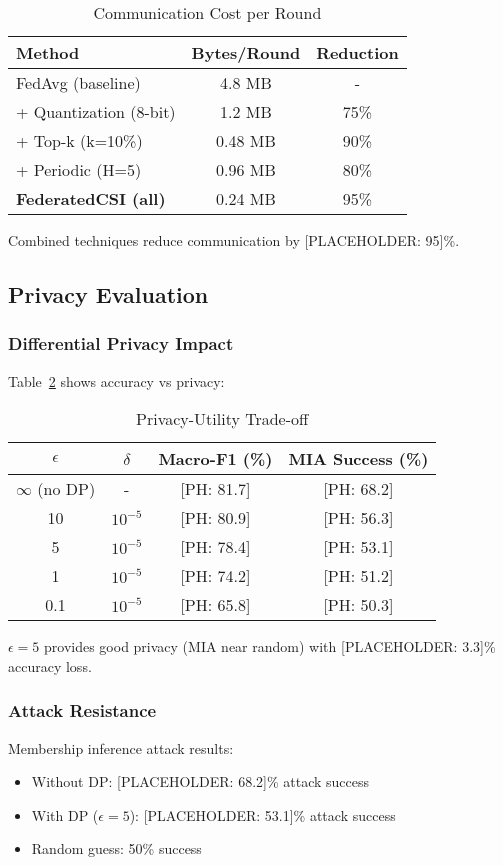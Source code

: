 \documentclass[journal]{IEEEtran}
\begin{document}
\begin{table}[h]
\centering
\caption{Communication Cost per Round}
\label{tab:communication}
\begin{tabular}{lcc}
\toprule
Method & Bytes/Round & Reduction \\
\midrule
FedAvg (baseline) & 4.8 MB & - \\
+ Quantization (8-bit) & 1.2 MB & 75\% \\
+ Top-k (k=10\%) & 0.48 MB & 90\% \\
+ Periodic (H=5) & 0.96 MB & 80\% \\
\textbf{FederatedCSI (all)} & 0.24 MB & 95\% \\
\bottomrule
\end{tabular}
\end{table}

Combined techniques reduce communication by [PLACEHOLDER: 95]\%.

\subsection{Privacy Evaluation}

\subsubsection{Differential Privacy Impact}
Table~\ref{tab:privacy} shows accuracy vs privacy:

\begin{table}[h]
\centering
\caption{Privacy-Utility Trade-off}
\label{tab:privacy}
\begin{tabular}{cccc}
\toprule
$\epsilon$ & $\delta$ & Macro-F1 (\%) & MIA Success (\%) \\
\midrule
$\infty$ (no DP) & - & [PH: 81.7] & [PH: 68.2] \\
10 & $10^{-5}$ & [PH: 80.9] & [PH: 56.3] \\
5 & $10^{-5}$ & [PH: 78.4] & [PH: 53.1] \\
1 & $10^{-5}$ & [PH: 74.2] & [PH: 51.2] \\
0.1 & $10^{-5}$ & [PH: 65.8] & [PH: 50.3] \\
\bottomrule
\end{tabular}
\end{table}

$\epsilon = 5$ provides good privacy (MIA near random) with [PLACEHOLDER: 3.3]\% accuracy loss.

\subsubsection{Attack Resistance}
Membership inference attack results:
\begin{itemize}
\item Without DP: [PLACEHOLDER: 68.2]\% attack success
\item With DP ($\epsilon=5$): [PLACEHOLDER: 53.1]\% attack success
\item Random guess: 50\% success
\end{itemize}
\end{document}
